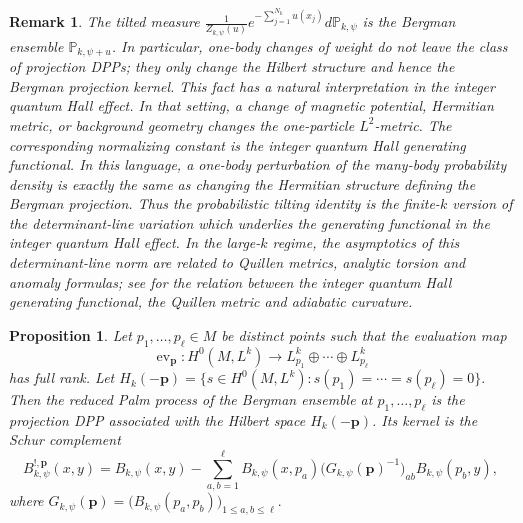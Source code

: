 \documentclass[12pt,a4paper,reqno]{article}
\theoremstyle{thmstyleone}
\newtheorem{proposition}[theorem]{Proposition}
\theoremstyle{thmstylethree}
\theoremstyle{thmstyletwo}
\newtheorem{remark}[theorem]{Remark}
\numberwithin{equation}{subsection}
\def\leq{\leqslant}
\begin{document}
\begin{remark}\label{rmk:tilting-preserves-Bergman-DPP}
The tilted measure $\frac{1}{Z_{k,\psi}(u)}e^{-\sum_{j=1}^{N_k}u(x_j)}d\mathbb P_{k,\psi}$ is the Bergman ensemble $\mathbb P_{k,\psi+u}$. In particular, one-body changes of weight do not leave the class of projection DPPs; they only change the Hilbert structure and hence the Bergman projection kernel. This fact has a natural interpretation in the integer quantum Hall effect. In that setting, a change of magnetic potential, Hermitian metric, or background geometry changes the one-particle $L^2$-metric. The corresponding normalizing constant is the integer quantum Hall generating functional. In this language, a one-body perturbation of the many-body probability density is exactly the same as changing the Hermitian structure defining the Bergman projection. Thus the probabilistic tilting identity is the finite-$k$ version of the determinant-line variation which underlies the generating functional in the integer quantum Hall effect. In the large-$k$ regime, the asymptotics of this determinant-line norm are related to Quillen metrics, analytic torsion and anomaly formulas; see \cite{KMMW} for the relation between the integer quantum Hall generating functional, the Quillen metric and adiabatic curvature.
\end{remark}


\begin{proposition}\label{prop:palm-bergman}
Let $p_1,\ldots,p_\ell\in M$ be distinct points such that the evaluation map
\[
\operatorname{ev}_{\mathbf p}:H^0(M,L^k)\to L^k_{p_1}\oplus\cdots\oplus L^k_{p_\ell}
\]
has full rank. Let $H_k(-\mathbf p)=\{s\in H^0(M,L^k):s(p_1)=\cdots=s(p_\ell)=0\}.$ Then the reduced Palm process of the Bergman ensemble at $p_1,\ldots,p_\ell$ is the
projection DPP associated with the Hilbert space $H_k(-\mathbf p)$. Its kernel is the Schur complement
\[
B^{!,\mathbf p}_{k,\psi}(x,y)
=
B_{k,\psi}(x,y)
-
\sum_{a,b=1}^{\ell}
B_{k,\psi}(x,p_a)
\bigl(G_{k,\psi}(\mathbf p)^{-1}\bigr)_{ab}
B_{k,\psi}(p_b,y),
\]
where $G_{k,\psi}(\mathbf p)=\bigl(B_{k,\psi}(p_a,p_b)\bigr)_{1\leq a,b\leq \ell}.$
\end{proposition}
\end{document}
